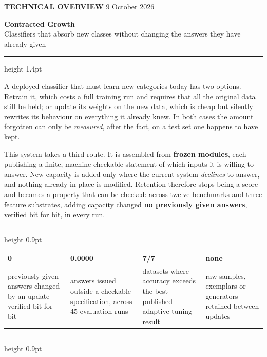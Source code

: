 \documentclass[11pt,a4paper]{article}
\newcommand{\lead}[1]{{\large #1}\par}
\begin{document}
\pagestyle{empty}

{\color{accent}\footnotesize\bfseries TECHNICAL OVERVIEW}
\hfill{\color{muted}\footnotesize 9 October 2026}

\vspace{0.4em}
{\Huge\bfseries Contracted Growth}\\[0.35em]
{\large\color{muted} Classifiers that absorb new classes without changing the
answers they have already given}

\vspace{0.6em}
{\color{rule}\hrule height 1.4pt}
\vspace{0.9em}

\lead{A deployed classifier that must learn new categories today has two
options. Retrain it, which costs a full training run and requires that all the
original data still be held; or update its weights on the new data, which is
cheap but silently rewrites its behaviour on everything it already knew. In both
cases the amount forgotten can only be \emph{measured}, after the fact, on a
test set one happens to have kept.}

This system takes a third route. It is assembled from \textbf{frozen modules},
each publishing a finite, machine-checkable statement of which inputs it is
willing to answer. New capacity is added only where the current system
\emph{declines} to answer, and nothing already in place is modified. Retention
therefore stops being a score and becomes a property that can be checked:
across twelve benchmarks and three feature substrates, adding capacity changed
\textbf{no previously given answers}, verified bit for bit, in every run.

\vspace{0.35em}
{\color{rule}\hrule height 0.9pt}
\vspace{0.45em}
\begin{tabular}{@{}p{3.55cm}p{3.55cm}p{3.55cm}p{3.55cm}@{}}
{\Large\bfseries\color{accent} 0} & {\Large\bfseries\color{accent} 0.0000} &
{\Large\bfseries\color{accent} 7/7} & {\Large\bfseries\color{accent} none}\\[-0.15em]
{\footnotesize\color{muted} previously given answers changed by an update ---
verified bit for bit} &
{\footnotesize\color{muted} answers issued outside a checkable specification,
across 45 evaluation runs} &
{\footnotesize\color{muted} datasets where accuracy exceeds the best published
adaptive-tuning result} &
{\footnotesize\color{muted} raw samples, exemplars or generators retained
between updates}\\
\end{tabular}
\vspace{0.3em}
{\color{rule}\hrule height 0.9pt}
\end{document}
